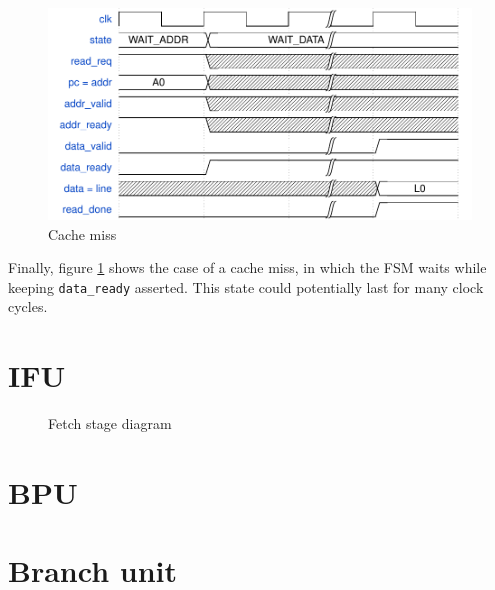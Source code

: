 \begin{figure}[hbt]
  \centering
  \includegraphics[width=\textwidth]{img/cache03.pdf}
  \caption{Cache miss}
  \label{fig:cache03}
\end{figure}
Finally, figure \ref{fig:cache03} shows the case of a cache miss, in which the \ac{FSM} waits while keeping \texttt{data\_ready} asserted. This state could potentially last for many clock cycles.

\section{\acf{IFU}}
\begin{figure}[hbt]
  \centering
  \caption{Fetch stage diagram}
  \label{fig:fetch_stage}
\end{figure}

\section{\acf{BPU}}

\section{Branch unit}